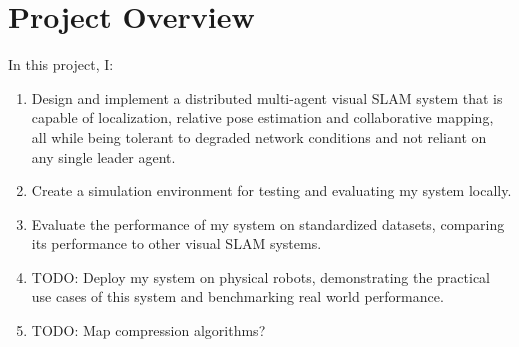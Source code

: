 \section{Project Overview}
\label{sec:1.3}
In this project, I: \noparskip
{
    \begin{enumerate}
        \item Design and implement a distributed multi-agent visual SLAM system that is capable of localization, relative pose estimation and  collaborative mapping, all while being tolerant to degraded network conditions and not reliant on any single leader agent.
        \item Create a simulation environment for testing and evaluating my system locally.
        \item Evaluate the performance of my system on standardized datasets, comparing its performance to other visual SLAM systems.
        \item TODO: Deploy my system on physical robots, demonstrating the practical use cases of this system and benchmarking real world performance.
        \item TODO: Map compression algorithms?
    \end{enumerate}
}
